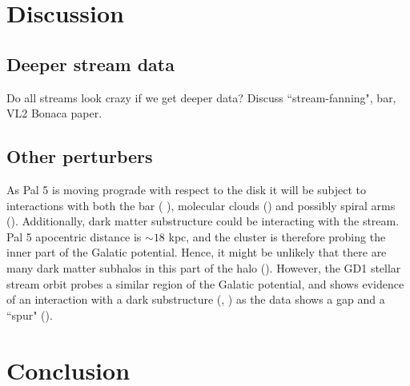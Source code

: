 \documentclass[twocolumn]{aastex62}
\begin{document}
%
%
%




\section{Discussion}
\label{sec:discussion}

\subsection{Deeper stream data}
Do all streams look crazy if we get deeper data? Discuss ``stream-fanning", bar, VL2 Bonaca paper.

\subsection{Other perturbers}
As Pal 5 is moving prograde with respect to the disk it will be subject to interactions with both the bar (\citealt{Hattori:2016}%
), molecular clouds (\citealt{Amorisco:2016}) and possibly spiral arms (\citealt{Banik:2019}). Additionally, dark matter substructure could be interacting with the stream. Pal 5 apocentric distance is $\sim 18$ kpc, and the cluster is therefore probing the inner part of the Galatic potential. Hence, it might be unlikely that there are many dark matter subhalos in this part of the halo (\citealt{Garrison-Kimmel:2017}). However, the GD1 stellar stream orbit probes a similar region of the Galatic potential, and shows evidence of an interaction with a dark substructure (\citealt{Price-Whelan:2018}, \citealt{Bonaca:2018b}) as the data shows a gap and a ``spur" (\citealt{Yoon:2011}).



\section{Conclusion}
\label{sec:conclusion}
\end{document}
